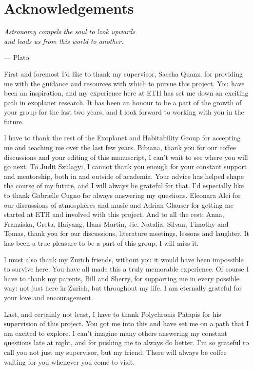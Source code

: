 

\chapter*{Acknowledgements}

\begin{flushright}
{\itshape
Astronomy compels the soul to look upwards \\and leads us from this world to another.}

\vspace{0.5em}
--- Plato
\end{flushright}

First and foremost I'd like to thank my supervisor, Sascha Quanz, for providing me with the guidance and resources with which to pursue this project.
You have been an inspiration, and my experience here at ETH has set me down an exciting path in exoplanet research.
It has been an honour to be a part of the growth of your group for the last two years, and I look forward to working with you in the future.

I have to thank the rest of the Exoplanet and Habitability Group for accepting me and teaching me over the last few years. 
Bibiana, thank you for our coffee discussions and your editing of this manuscript, I can't wait to see where you will go next.
To Judit Szulagyi, I cannot thank you enough for your constant support and mentorship, both in and outside of academia. 
Your advice has helped shape the course of my future, and I will always be grateful for that.
I'd especially like to  thank Gabrielle Cugno for always answering my questions, Eleonara Alei for our discussions of atmospheres and music and Adrian Glauser for getting me started at ETH and involved with this project.
And to all the rest: Anna, Franziska, Greta, Haiyang, Hans-Martin, Jie, Natalia, Silvan, Timothy and Tomas, thank you for our discussions, literature meetings, lessons and laughter. 
It has been a true pleasure to be a part of this group, I will miss it.

I must also thank my Zurich friends, without you it would have been impossible to survive here.
You have all made this a truly memorable experience.
Of course I have to thank my parents, Bill and Sherry, for supporting me in every possible way: not just here in Zurich, but throughout my life. 
I am eternally grateful for your love and encouragement.

Last, and certainly not least, I have to thank Polychronis Patapis for his supervision of this project. 
You got me into this and have set me on a path that I am excited to explore.
I can't imagine many others answering my constant questions late at night, and for pushing me to always do better. 
I'm so grateful to call you not just my supervisor, but my friend. 
There will always be coffee waiting for you whenever you come to visit.

\bigskip
\bigskip
